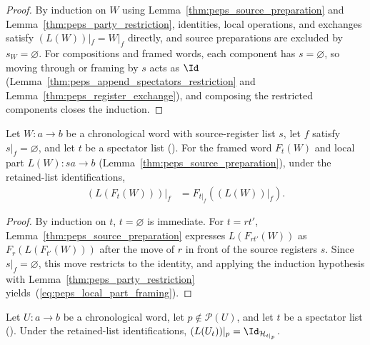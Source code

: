 \begin{proof}\leanok
    By induction on $W$ using Lemma~\ref{thm:peps_source_preparation} and
    Lemma~\ref{thm:peps_party_restriction}, identities, local operations, and
    exchanges satisfy $(L(W))|_f=W|_f$ directly, and source preparations are
    excluded by $s_W=\varnothing$. For compositions and framed words, each
    component has $s=\varnothing$, so moving through or framing by $s$ acts as
    $\Id$ (Lemma~\ref{thm:peps_append_spectators_restriction} and
    Lemma~\ref{thm:peps_register_exchange}), and composing the restricted
    components closes the induction.
\end{proof}

\begin{lemma}
    \label{thm:peps_local_part_framing_restriction}
    \leanok
    Let $W:a\to b$ be a chronological word with source-register list $s$, let
    $f$ satisfy $s|_f=\varnothing$, and let $t$ be a spectator list
    (\cite[proof of Theorem~5.2]{OpenAI2026PolynomialPEPS}). For the framed
    word $F_t(W)$ and local part $L(W):sa\to b$
    (Lemma~\ref{thm:peps_source_preparation}), under the retained-list
    identifications,
    \begin{align}
        (L(F_t(W)))|_f
         & =F_{t|_f}((L(W))|_f).
        \label{eq:peps_local_part_framing}
    \end{align}
\end{lemma}

\begin{proof}\leanok
    By induction on $t$, $t=\varnothing$ is immediate. For $t=rt'$,
    Lemma~\ref{thm:peps_source_preparation} expresses $L(F_{rt'}(W))$ as
    $F_r(L(F_{t'}(W)))$ after the move of $r$ in front of the source
    registers $s$. Since $s|_f=\varnothing$, this move restricts to the
    identity, and applying the induction hypothesis with
    Lemma~\ref{thm:peps_party_restriction} yields~(\ref{eq:peps_local_part_framing}).
\end{proof}


\begin{lemma}
    \label{thm:peps_absent_party_spectator_identity}
    \leanok
    Let $U:a\to b$ be a chronological word, let $p\notin\mathcal P(U)$, and let
    $t$ be a spectator list (\cite[proof of Theorem~5.2]{OpenAI2026PolynomialPEPS}).
    Under the retained-list identifications,
    $(L(U_t))|_p=\Id_{\mathcal H_{t|_p}}$.
\end{lemma}

